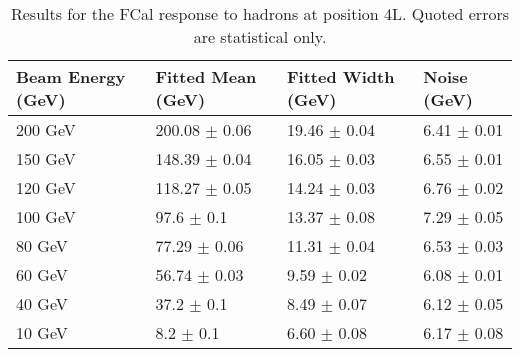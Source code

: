 \begin{table}[!htb]
\begin{center}
\begin{tabular}{|l|l|l|l|}
\hline
Beam Energy (GeV) & Fitted Mean (GeV)& Fitted Width (GeV)& Noise (GeV) \\
\hline
200 GeV  &  200.08 $\pm$    0.06 &   19.46 $\pm$    0.04 &    6.41 $\pm$    0.01 \\
150 GeV  &  148.39 $\pm$    0.04 &   16.05 $\pm$    0.03 &    6.55 $\pm$    0.01 \\
120 GeV  &  118.27 $\pm$    0.05 &   14.24 $\pm$    0.03 &    6.76 $\pm$    0.02 \\
100 GeV  &   97.6 $\pm$    0.1 &   13.37 $\pm$    0.08 &    7.29 $\pm$    0.05 \\
80 GeV  &   77.29 $\pm$    0.06 &   11.31 $\pm$    0.04 &    6.53 $\pm$    0.03 \\
60 GeV  &   56.74 $\pm$    0.03 &    9.59 $\pm$    0.02 &    6.08 $\pm$    0.01 \\
40 GeV  &   37.2 $\pm$    0.1 &    8.49 $\pm$    0.07 &    6.12 $\pm$    0.05 \\
10 GeV  &    8.2 $\pm$    0.1 &    6.60 $\pm$    0.08 &    6.17 $\pm$    0.08 \\
\hline
\end{tabular}
\end{center}
\caption[Hadron response, 4L]{Results for the FCal response to hadrons at position 4L. Quoted errors are statistical only.}
\label{TBres_table_hadron_4L}
\end{table}
